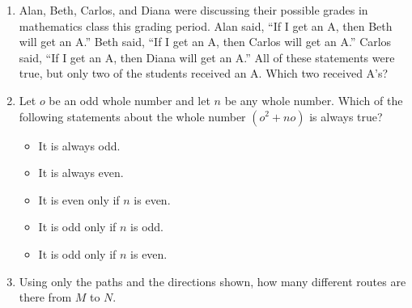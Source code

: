 \documentclass{article}
\begin{document}
\begin{multicols*}{2}
\begin{enumerate}
\begin{center}
            \end{center}
            \vspace{3cm}
        \item Alan, Beth, Carlos, and Diana were discussing their possible grades in mathematics class this grading period.
            Alan said, ``If I get an A, then Beth will get an A.''
            Beth said, ``If I get an A, then Carlos will get an A.''
            Carlos said, ``If I get an A, then Diana will get an A.''
            All of these statements were true, but only two of the students received an A.
            Which two received A's?
            \vspace{3cm}
        \item Let $o$ be an odd whole number and let $n$ be any whole number.
            Which of the following statements about the whole number $(o^2 + no)$ is always true?
            \begin{itemize}
                \item It is always odd.
                \item It is always even.
                \item It is even only if $n$ is even.
                \item It is odd only if $n$ is odd.
                \item It is odd only if $n$ is even.
            \end{itemize}
            \vspace{3cm}
        \item Using only the paths and the directions shown, how many different routes are there from $M$ to $N$.
            \begin{center}
            \end{center}
            \vspace{3cm}
    \end{enumerate}
\end{multicols*}
\end{document}
